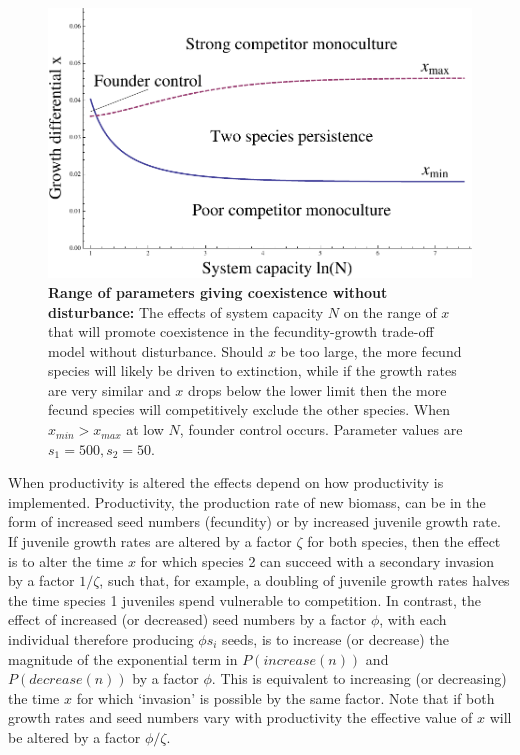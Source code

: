 \begin{figure}
  \includegraphics[width=4.5in]{xrangeofcoexist.pdf}
   \caption[Range of parameters giving coexistence without disturbance]{\textbf{Range of parameters giving coexistence without disturbance:} The effects of system capacity $N$ on the range of $x$ that will promote coexistence in the fecundity-growth trade-off model without disturbance. Should $x$ be too large, the more fecund species will likely be driven to extinction, while if the growth rates are very similar and $x$ drops below the lower limit then the more fecund species will competitively exclude the other species. When $x_{min}>x_{max}$ at low $N$, founder control occurs. Parameter values are $s_1=500,s_2=50$.}
 \label{fig:systemsize}
\end{figure}

When productivity is altered the effects depend on how productivity is implemented. Productivity, the production rate of new biomass, can be in the form of increased seed numbers (fecundity) or by increased juvenile growth rate. If juvenile growth rates are altered by a factor $\zeta$ for both species, then the effect is to alter the time $x$ for which species 2 can succeed with a secondary invasion by a factor $1/\zeta$, such that, for example, a doubling of juvenile growth rates halves the time species 1 juveniles spend vulnerable to competition.  In contrast, the effect of increased (or decreased) seed numbers by a factor $\phi$, with each individual therefore producing $\phi s_i$ seeds, is to increase (or decrease) the magnitude of the exponential term in $P(increase(n))$ and $P(decrease(n))$ by a factor $\phi$. This is equivalent to increasing (or decreasing) the time $x$ for which `invasion' is possible by the same factor. Note that if both growth rates and seed numbers vary with productivity the effective value of $x$ will be altered by a factor $\phi / \zeta$.

